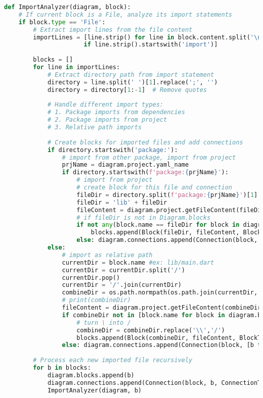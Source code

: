 \begin{lstlisting}[language=Python, caption={$\texttt{ImportAnalyzer}$ function.}, label={lst:9}]
def ImportAnalyzer(diagram, block):
    # If current block is a File, analyze its import statements
    if block.type == 'File':
        # Extract import lines from the file content
        importLines = [line.strip() for line in block.content.split('\n') 
                      if line.strip().startswith('import')]
        
        blocks = []
        for line in importLines:
            # Extract directory path from import statement
            directory = line.split(' ')[1].replace(';', '')
            directory = directory[1:-1]  # Remove quotes
            
            # Handle different import types:
            # 1. Package imports from dependencies
            # 2. Package imports from project
            # 3. Relative path imports
            
            # Create blocks for imported files and add connections
            if directory.startswith('package:'):
                # import from other package, import from project
                prjName = diagram.project.yaml_name
                if directory.startswith(f'package:{prjName}'):
                    # import from project
                    # create block for this file and connection
                    fileDir = directory.split(f'package:{prjName}')[1]
                    fileDir = 'lib' + fileDir
                    fileContent = diagram.project.getFileContent(fileDir)
                    # if fileDir is not in Diagram.blocks
                    if not any(block.name == fileDir for block in diagram.blocks):
                        blocks.append(Block(fileDir, fileContent, BlockType.FILE))
                    else: diagram.connections.append(Connection(block, [b for b in diagram.blocks if b.name == fileDir][0], ConnectionType.IMPORT))
            else:
                # import as relative path
                currentDir = block.name #ex: lib/main.dart
                currentDir = currentDir.split('/')
                currentDir.pop()
                currentDir = '/'.join(currentDir)
                combineDir = os.path.normpath(os.path.join(currentDir, directory))
                # print(combineDir)
                fileContent = diagram.project.getFileContent(combineDir)
                if combineDir not in [block.name for block in diagram.blocks]:
                    # turn \ into /
                    combineDir = combineDir.replace('\\','/')
                    blocks.append(Block(combineDir, fileContent, BlockType.FILE))
                else: diagram.connections.append(Connection(block, [b for b in diagram.blocks if b.name == combineDir][0], ConnectionType.IMPORT))
        
        # Process each new imported file recursively
        for b in blocks:
            diagram.blocks.append(b)
            diagram.connections.append(Connection(block, b, ConnectionType.IMPORT))
            ImportAnalyzer(diagram, b)
\end{lstlisting}

